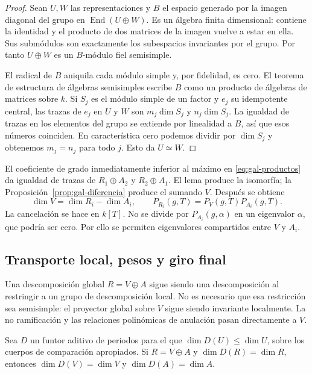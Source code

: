 \begin{proof}
Sean $U,W$ las representaciones y $B$ el espacio generado por
la imagen diagonal del grupo en $\operatorname{End}(U\oplus W)$.
Es un álgebra finita dimensional: contiene la identidad y
el producto de dos matrices de la imagen vuelve a estar en ella.
Sus submódulos son exactamente los subespacios invariantes por
el grupo. Por tanto $U\oplus W$ es un $B$-módulo fiel semisimple.

El radical de $B$ aniquila cada módulo simple y, por fidelidad,
es cero. El teorema de estructura de álgebras semisimples escribe
$B$ como un producto de álgebras de matrices sobre $k$.
Si $S_j$ es el módulo simple de un factor y $e_j$ su idempotente
central, las trazas de $e_j$ en $U$ y $W$ son
$m_j\dim S_j$ y $n_j\dim S_j$. La igualdad de trazas en los
elementos del grupo se extiende por linealidad a $B$, así que
esos números coinciden. En característica cero podemos dividir
por $\dim S_j$ y obtenemos $m_j=n_j$ para todo $j$.
Esto da $U\simeq W$.
\end{proof}

El coeficiente de grado inmediatamente inferior al máximo en
\eqref{eq:gal-productos} da igualdad de trazas de
$R_1\oplus A_2$ y $R_2\oplus A_1$.
El lema produce la isomorfía; la
Proposición~\ref{prop:gal-diferencia} produce el sumando $V$.
Después se obtiene
\begin{equation}
 \dim V=\dim R_i-\dim A_i,\qquad
 P_{R_i}(g,T)=P_V(g,T)P_{A_i}(g,T).
 \label{eq:gal-cancelacion}
\end{equation}
La cancelación se hace en $k[T]$. No se divide por
$P_{A_i}(g,\alpha)$ en un eigenvalor $\alpha$,
que podría ser cero. Por ello se permiten eigenvalores
compartidos entre $V$ y $A_i$.

\subsection{Transporte local, pesos y giro final}

Una descomposición global $R=V\oplus A$ sigue siendo una
descomposición al restringir a un grupo de descomposición local.
No es necesario que esa restricción sea semisimple:
el proyector global sobre $V$ sigue siendo invariante localmente.
La no ramificación y las relaciones polinómicas de anulación
pasan directamente a $V$.

\begin{lema}
\label{lem:gal-periodos}
Sea $D$ un funtor aditivo de periodos para el que
$\dim D(U)\le\dim U$, sobre los cuerpos de comparación apropiados.
Si $R=V\oplus A$ y $\dim D(R)=\dim R$, entonces
$\dim D(V)=\dim V$ y $\dim D(A)=\dim A$.
\end{lema}

